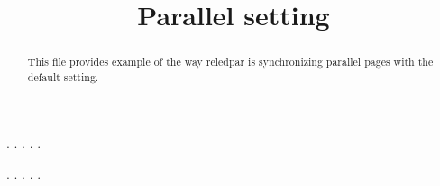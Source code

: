\documentclass[a5paper,12pt]{article}
\begin{document}
\large

\date{}
\title{Parallel setting}
\maketitle

\begin{abstract}
This file provides example of the way reledpar is synchronizing parallel pages with the default setting.
\end{abstract}


\begin{pages}
    \begin{Leftside}
        \beginnumbering
            . \blindtext[21]
            \pend{}. \blindtext[10]
            \pend{}. \blindtext[6]
            \pend{}. \blindtext[6]
            \pend
            . \blindtext[6]
            \pend
        \endnumbering
    \end{Leftside}
    \begin{Rightside}
        \beginnumbering
            . \blindtext[22]\footnoteAmk
            \pend{}. \blindtext[12]
            \pend{}. \blindtext[12]
            \pend
            . \blindtext[12]
            \pend
            . \blindtext[12]
            \pend
        \endnumbering
    \end{Rightside}
\end{pages}
\Pages
\end{document}

